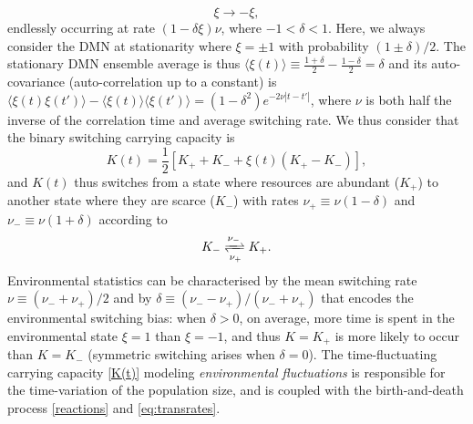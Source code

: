 \documentclass{article}
\begin{document}
\begin{equation}
 \xi \longrightarrow -\xi, \label{switch}
\end{equation}
endlessly occurring at rate $(1-\delta \xi)\nu$, where $-1<\delta<1$. Here, we always consider the DMN at stationarity where $\xi=\pm 1$ with probability $(1\pm \delta)/2$. The stationary DMN ensemble average is thus $\langle \xi(t)\rangle\equiv \frac{1+ \delta}{2}- \frac{1- \delta}{2}=\delta$ and its auto-covariance (auto-correlation up to a constant) is $\langle \xi(t)\xi(t')\rangle - \langle\xi(t)\rangle\langle\xi(t')\rangle =(1-\delta^2)e^{-2\nu|t-t'|}$,
where $\nu$ is both half the inverse of the correlation time and average switching rate.
We thus consider that the binary switching carrying capacity is~\cite{wienand2017evolution, wienand2018eco, west2020, taitelbaum2020population}
\begin{equation}
K(t)=\frac{1}{2}\left[K_+ +K_- +\xi(t)(K_+ - K_-)\right]
  \label{K(t)},
\end{equation}
%
and $K(t)$ thus switches from a state where resources are  abundant ($K_+$) to another state where they are scarce ($K_-$) with rates $\nu_+\equiv\nu(1-\delta)$ and $\nu_-\equiv\nu(1+\delta)$ according to \[K_-\xrightleftharpoons[\nu_+]{\nu_-}K_+.\] Environmental statistics can be characterised by the mean switching rate \(\nu\equiv(\nu_-+\nu_+)/2\) and by \(\delta\equiv(\nu_--\nu_+)/(\nu_-+\nu_+)\) that encodes the environmental switching bias: when $\delta>0$, on average, more time is spent in the environmental state $\xi=1$ than  $\xi=-1$, and thus $K=K_+$ is more likely to occur than $K=K_-$ (symmetric switching arises when $\delta=0$). The time-fluctuating carrying capacity \eqref{K(t)} modeling {\it environmental fluctuations} is responsible for the time-variation of the population size, and is coupled with the birth-and-death process \eqref{reactions} and \eqref{eq:transrates}.  
\end{document}
